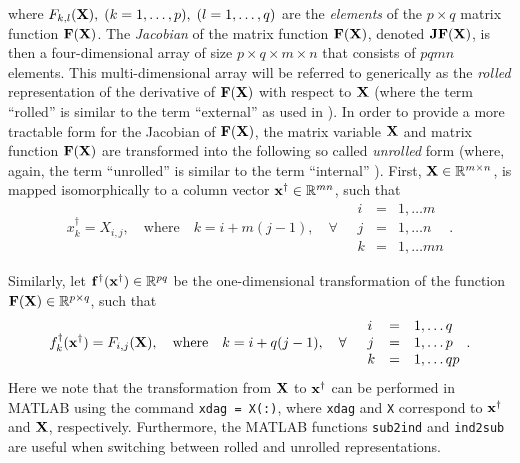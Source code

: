 \documentclass[10pt,pdftex]{article}
\begin{document}
where $F_{k,l}(\mathbf{X}),\;(k=1,\ldots,p),\;(l=1,\ldots,q)$ are the 
{\em elements} of the $p\times q$ matrix function $\mathbf{F}(\mathbf{X})$.  
The {\em Jacobian} of the matrix function $\mathbf{F}(\mathbf{X})$, denoted
$\mathbf{J}\mathbf{F}(\mathbf{X})$, is then a four-dimensional array of size $p\times
q\times m\times n$ that consists of $pqmn$ elements.  This
multi-dimensional array will be referred to generically as the 
{\em rolled} representation of the derivative of $\mathbf{F}(\mathbf{X})$ with
respect to $\mathbf{X}$ (where the term ``rolled'' is similar to the term
``external'' as used in \cite{Forth1}).  In order to provide a more tractable form for
the Jacobian of $\mathbf{F}(\mathbf{X})$, the matrix variable $\mathbf{X}$ and matrix
function $\mathbf{F}(\mathbf{X})$ are transformed into the following so called 
{\em unrolled} form (where, again, the term ``unrolled'' is similar to
the term ``internal'' \cite{Forth1}).  First, $\mathbf{X}\in\mathbb{R}^{m\times n}$, is mapped
isomorphically to a column vector $\mathbf{x}^\dag\in\mathbb{R}^{mn}$, such that
\begin{equation}\label{general-vector-xdag}
  x^\dag _k = X_{i,j}, \quad \text{where} \quad k = i+m(j-1),\quad \forall \quad \begin{array}{lll}
  i & = & 1,\dots m \\
  j & = & 1,\dots n \\
  k & = & 1,\dots mn
  \end{array}.
\end{equation}


Similarly, let
$\mathbf{f}^\dag(\mathbf{x}^{\dag})\in\mathbb{R}^{pq}$ be the one-dimensional
transformation of the function $\mathbf{F}(\mathbf{X})\in\mathbb{R}^{p\times q}$, such that 
\begin{equation}\label{general-function-fdag}
  f^\dag _k(\mathbf{x}^\dag) = F_{i,j}(\mathbf{X}), \quad \text{where} \quad k = i+q(j-1),\quad \forall \quad \begin{array}{lll}
  i & = & 1,\dots q \\
  j & = & 1,\dots p \\
  k & = & 1,\dots qp
  \end{array}.
\end{equation}
Here we note that the transformation from $\mathbf{X}$ to $\mathbf{x}^\dag$ can be performed in MATLAB using the command \texttt{xdag = X(:)}, where \texttt{xdag} and \texttt{X} correspond to $\mathbf{x}^\dag$ and $\mathbf{X}$, respectively. Furthermore, the MATLAB functions \texttt{sub2ind} and \texttt{ind2sub} are useful when switching between rolled and unrolled representations.
\end{document}
